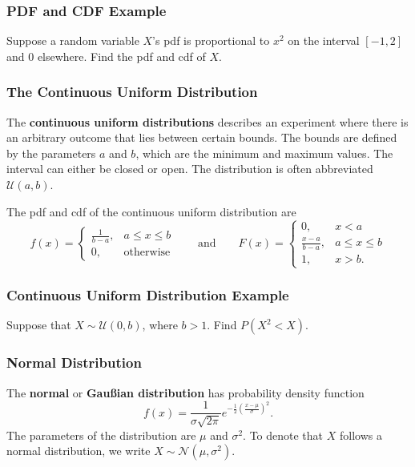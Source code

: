 \documentclass{beamer}
\begin{document}
\begin{frame}[t]
\frametitle{PDF and CDF Example}
\begin{Example}
Suppose a random variable $X$'s pdf is proportional to $x^2$ on the interval $[-1, 2]$ and 0 elsewhere. Find the pdf and cdf of $X$.
\end{Example}

\end{frame}

\begin{frame}
\frametitle{The Continuous Uniform Distribution} 
\small 
\begin{Definition}
The {\bf continuous uniform distributions} describes an experiment where there is an arbitrary outcome that lies between certain bounds. The bounds are defined by the parameters $a$ and $b$, which are the minimum and maximum values. The interval can either be closed or open. The distribution is often abbreviated $\mathcal{U}(a, b)$. 
\end{Definition}
The pdf and cdf of the continuous uniform distribution are
$$
f(x) = \begin{cases} \displaystyle\frac{1}{b - a},	&	a\leq x\leq b\\ 0, & \text{otherwise}\end{cases}\qquad\text{and}\qquad F(x) = \begin{cases} 0,	&	x < a\\ \displaystyle\frac{x - a}{b - a}, & 	a\leq x\leq b\\	1,	&	x > b.\end{cases}
$$
\end{frame}

\begin{frame}[t]
\frametitle{Continuous Uniform Distribution Example}
\begin{Example}
Suppose that $X\sim{\mathcal{U}(0, b)}$, where $b > 1$. Find $P(X^2 < X)$.
\end{Example}

\end{frame}

\begin{frame}
\frametitle{Normal Distribution}
\begin{Definition}
The {\bf normal} or {\bf Gau{\ss}ian distribution} has probability density function 
$$
\displaystyle f(x) = \frac{1}{\sigma \sqrt{2\pi}} e^{-\frac{1}{2}\left(\frac{x - \mu}{\sigma}\right)^2}.
$$
The parameters of the distribution are $\mu$ and $\sigma^2$. To denote that $X$ follows a normal distribution, we write $X\sim{\mathcal{N}(\mu, \sigma^2)}$.
\end{Definition} 
\end{frame}
\end{document}

